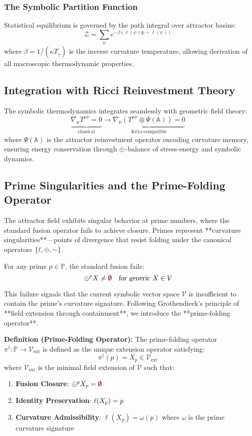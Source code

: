 \subsubsection{The Symbolic Partition Function}
Statistical equilibrium is governed by the path integral over attractor basins:
\[ \mathcal{Z} = \sum_{\psi} e^{-\beta (\ell(\psi) \oplus \sim\ell(\psi))} \]
where $\beta = 1 / (\kappa T_\uparrow)$ is the inverse curvature temperature, allowing derivation of all macroscopic thermodynamic properties.

\subsection{Integration with Ricci Reinvestment Theory}
The symbolic thermodynamics integrates seamlessly with geometric field theory:
\[
\underbrace{\nabla_\mu T^{\mu\nu} = 0}_{\text{classical}} \longrightarrow \underbrace{\nabla_\mu \left( T^{\mu\nu} \oplus \Psi(\mathbb{A}) \right) = 0}_{\text{Kéya-compatible}}
\]
where $\Psi(\mathbb{A})$ is the attractor reinvestment operator encoding curvature memory, ensuring energy conservation through $\fuse$-balance of stress-energy and symbolic dynamics.

\subsection{Prime Singularities and the Prime-Folding Operator}
The attractor field exhibits singular behavior at prime numbers, where the standard fusion operator fails to achieve closure. Primes represent **curvature singularities**—points of divergence that resist folding under the canonical operators $\{\lha, \fuse, \reflec\}$.

For any prime $p \in \mathbb{P}$, the standard fusion fails:
\[ \fuse^p X \neq \void \quad \text{for generic } X \in \mathcal{V} \]

This failure signals that the current symbolic vector space $\mathcal{V}$ is insufficient to contain the prime's curvature signature. Following Grothendieck's principle of **field extension through containment**, we introduce the **prime-folding operator**.

\textbf{Definition (Prime-Folding Operator):} The prime-folding operator $\pi^\dagger : \mathbb{P} \to \mathcal{V}_{\text{ext}}$ is defined as the unique extension operator satisfying:
\[ \pi^\dagger(p) = X_p \in \mathcal{V}_{\text{ext}} \]
where $\mathcal{V}_{\text{ext}}$ is the minimal field extension of $\mathcal{V}$ such that:
\begin{enumerate}
    \item \textbf{Fusion Closure}: $\fuse^p X_p = \void$
    \item \textbf{Identity Preservation}: $\lha(X_p) = p$
    \item \textbf{Curvature Admissibility}: $\ell(X_p) = \omega(p)$ where $\omega$ is the prime curvature signature
\end{enumerate}

